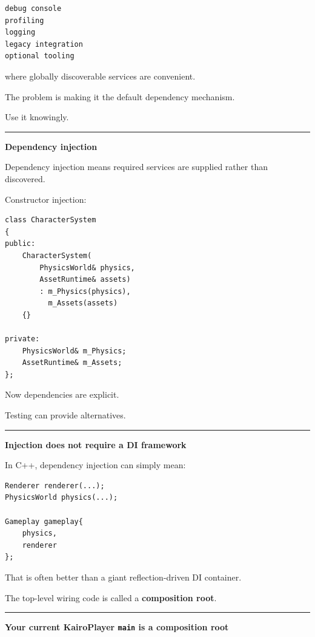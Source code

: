 \begin{verbatim}
debug console
profiling
logging
legacy integration
optional tooling
\end{verbatim}

where globally discoverable services are convenient.

The problem is making it the default dependency mechanism.

Use it knowingly.

\begin{center}\rule{0.5\linewidth}{0.5pt}\end{center}

\textbf{Dependency injection}

Dependency injection means required services are supplied rather than discovered.

Constructor injection:

\begin{verbatim}
class CharacterSystem
{
public:
    CharacterSystem(
        PhysicsWorld& physics,
        AssetRuntime& assets)
        : m_Physics(physics),
          m_Assets(assets)
    {}

private:
    PhysicsWorld& m_Physics;
    AssetRuntime& m_Assets;
};
\end{verbatim}

Now dependencies are explicit.

Testing can provide alternatives.

\begin{center}\rule{0.5\linewidth}{0.5pt}\end{center}

\textbf{Injection does not require a DI framework}

In C++, dependency injection can simply mean:

\begin{verbatim}
Renderer renderer(...);
PhysicsWorld physics(...);

Gameplay gameplay{
    physics,
    renderer
};
\end{verbatim}

That is often better than a giant reflection-driven DI container.

The top-level wiring code is called a \textbf{composition root}.

\begin{center}\rule{0.5\linewidth}{0.5pt}\end{center}

\textbf{Your current KairoPlayer \texttt{main} is a composition root}

